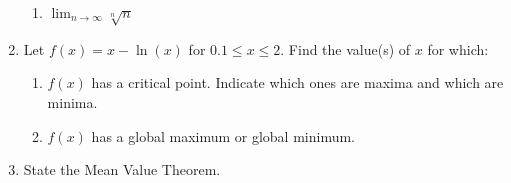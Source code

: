 \documentclass[11pt]{article}
\begin{document}
\begin{enumerate}
\begin{enumerate}
  \item $\displaystyle\lim_{n\to \infty}\sqrt[n]{n}$

    \vfill
  \end{enumerate}
  \newpage


\item Let $f(x)=x-\ln(x)$ for $0.1\leq x\leq 2$. Find the value(s) of
  $x$ for which:
  \begin{enumerate}
  \item $f(x)$ has a critical point. Indicate which
    ones are maxima and which are minima.

    \vfill
    
  \item $f(x)$ has a global maximum or global minimum.

    \vfill
  \end{enumerate}
  \newpage
  
\item State the Mean Value Theorem.


\end{enumerate}
\end{document}
